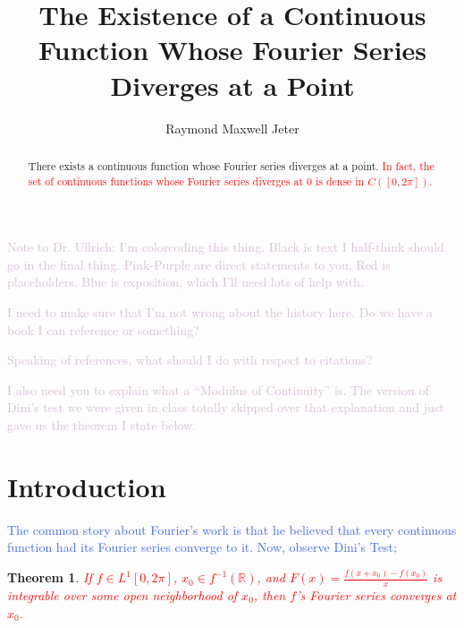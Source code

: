 \documentclass{amsart}
\newcommand{\R}{\mathbb{R}}
\newcommand{\colorcomment}[2]{\textcolor{#1}{#2}} %
\newtheorem{thm}{Theorem}[section]
\theoremstyle{definition}
\begin{document}
\title{The Existence of a Continuous Function Whose Fourier Series Diverges at a Point}
\author{Raymond Maxwell Jeter}

\begin{abstract}
There exists a continuous function whose Fourier series diverges at a point. 
\colorcomment{red}{In fact, the set of continuous functions whose Fourier series diverges at $0$ is dense in $C([0,2 \pi])$.}
\end{abstract}

\maketitle

\colorcomment{Thistle}{Note to Dr. Ullrich: I'm colorcoding this thing. Black is text I half-think should go in the final thing. Pink-Purple are direct statements to you. Red is placeholders. Blue is exposition, which I'll need lots of help with.}

\colorcomment{Thistle}{I need to make sure that I'm not wrong about the history here. Do we have a book I can reference or something?}

\colorcomment{Thistle}{Speaking of references, what should I do with respect to citations?}

\colorcomment{Thistle}{I also need you to explain what a ``Modulus of Continuity'' is. The version of Dini's test we were given in class totally skipped over that explanation and just gave us the theorem I state below.}

\section{Introduction}


\colorcomment{RoyalBlue}{The common story about Fourier's work is that he believed that every continuous function had its Fourier series converge to it. 
Now, observe Dini's Test;}

\begin{thm}
\colorcomment{red}{If $f \in L^1[0, 2\pi]$, $x_0 \in f^{-1}(\R)$, and $F(x) = \frac{f(x+x_0) - f(x_0)}{x}$ is integrable over some open neighborhood of $x_0$, then $f$'s Fourier series converges at $x_0$.}
\end{thm}
\end{document}
